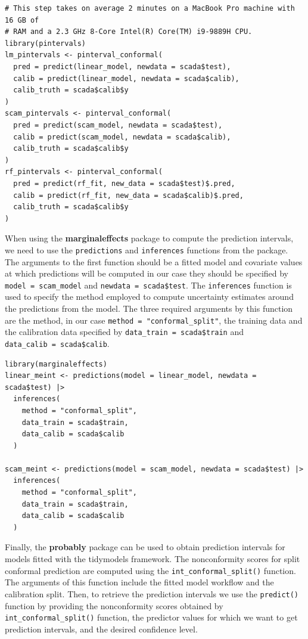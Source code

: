\begin{verbatim}
# This step takes on average 2 minutes on a MacBook Pro machine with 16 GB of 
# RAM and a 2.3 GHz 8-Core Intel(R) Core(TM) i9-9889H CPU.
library(pintervals)
lm_pintervals <- pinterval_conformal(
  pred = predict(linear_model, newdata = scada$test),
  calib = predict(linear_model, newdata = scada$calib),
  calib_truth = scada$calib$y
)
scam_pintervals <- pinterval_conformal(
  pred = predict(scam_model, newdata = scada$test),
  calib = predict(scam_model, newdata = scada$calib),
  calib_truth = scada$calib$y
)
rf_pintervals <- pinterval_conformal(
  pred = predict(rf_fit, new_data = scada$test)$.pred,
  calib = predict(rf_fit, new_data = scada$calib)$.pred,
  calib_truth = scada$calib$y
)
\end{verbatim}

When using the \textbf{marginaleffects} package to compute the prediction
intervals, we need to use the \texttt{predictions} and \texttt{inferences} functions
from the package. The arguments to the first function should be a fitted
model and covariate values at which predictions will be computed in our
case they should be specified by \texttt{model\ =\ scam\_model} and
\texttt{newdata\ =\ scada\$test}. The \texttt{inferences} function is used to specify the
method employed to compute uncertainty estimates around the predictions
from the model. The three required arguments by this function are the
method, in our case \texttt{method\ =\ "conformal\_split"}, the training data and
the calibration data specified by \texttt{data\_train\ =\ scada\$train} and
\texttt{data\_calib\ =\ scada\$calib}.

\begin{verbatim}
library(marginaleffects)
linear_meint <- predictions(model = linear_model, newdata = scada$test) |>
  inferences(
    method = "conformal_split",
    data_train = scada$train,
    data_calib = scada$calib
  )

scam_meint <- predictions(model = scam_model, newdata = scada$test) |>
  inferences(
    method = "conformal_split",
    data_train = scada$train,
    data_calib = scada$calib
  )
\end{verbatim}

Finally, the \textbf{probably} package can be used to obtain prediction
intervals for models fitted with the tidymodels framework. The
nonconformity scores for split conformal prediction are computed using
the \texttt{int\_conformal\_split()} function. The arguments of this function
include the fitted model workflow and the calibration split. Then, to
retrieve the prediction intervals we use the \texttt{predict()} function by
providing the nonconformity scores obtained by \texttt{int\_conformal\_split()}
function, the predictor values for which we want to get prediction
intervals, and the desired confidence level.

